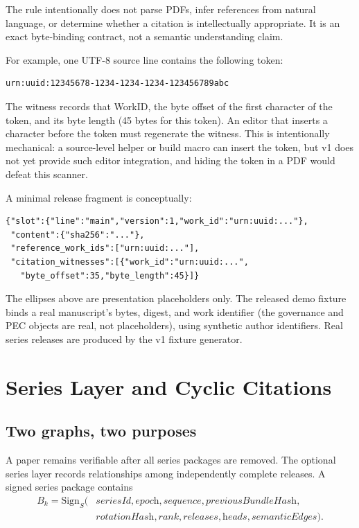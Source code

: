 \documentclass[11pt]{article}
\begin{document}
The rule intentionally does not parse PDFs, infer references from natural language, or determine whether a citation is intellectually appropriate. It is an exact byte-binding contract, not a semantic understanding claim.

For example, one UTF-8 source line contains the following token:
\begin{verbatim}
urn:uuid:12345678-1234-1234-1234-123456789abc
\end{verbatim}
The witness records that WorkID, the byte offset of the first character of the
token, and its byte length (45 bytes for this token). An editor that inserts a
character before the token must regenerate the witness. This is intentionally
mechanical: a source-level helper or build macro can insert the token, but v1
does not yet provide such editor integration, and hiding the token in a PDF
would defeat this scanner.

A minimal release fragment is conceptually:
\begin{verbatim}
{"slot":{"line":"main","version":1,"work_id":"urn:uuid:..."},
 "content":{"sha256":"..."},
 "reference_work_ids":["urn:uuid:..."],
 "citation_witnesses":[{"work_id":"urn:uuid:...",
   "byte_offset":35,"byte_length":45}]}
\end{verbatim}
The ellipses above are presentation placeholders only. The released demo
fixture binds a real manuscript's bytes, digest, and work identifier (the
governance and PEC objects are real, not placeholders), using synthetic author
identifiers. Real series releases are produced by the v1 fixture generator.

\section{Series Layer and Cyclic Citations}

\subsection{Two graphs, two purposes}

A paper remains verifiable after all series packages are removed. The optional series layer records relationships among independently complete releases. A signed series package contains
\[
\begin{aligned}
  B_k = \mathrm{Sign}_{S}(&\textit{seriesId},\textit{epoch},\textit{sequence},\textit{previousBundleHash},\\
                           &\textit{rotationHash},\textit{rank},\textit{releases},\textit{heads},\textit{semanticEdges}).
\end{aligned}
\]
\end{document}
